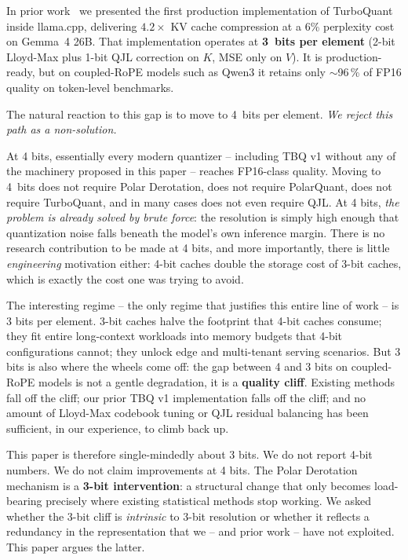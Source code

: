 \documentclass[10pt,twocolumn]{article}
\begin{document}
In prior work~\cite{turboquant_impl2026} we presented the first production implementation of TurboQuant~\cite{turboquant2026} inside llama.cpp, delivering $4.2\times$ KV cache compression at a 6\% perplexity cost on Gemma~4 26B. That implementation operates at \textbf{3~bits per element} (2-bit Lloyd-Max plus 1-bit QJL correction on $K$, MSE only on $V$). It is production-ready, but on coupled-RoPE models such as Qwen3 it retains only $\sim$96\,\% of FP16 quality on token-level benchmarks.

The natural reaction to this gap is to move to 4~bits per element. \emph{We reject this path as a non-solution.}

At 4 bits, essentially every modern quantizer -- including TBQ v1 without any of the machinery proposed in this paper -- reaches FP16-class quality. Moving to 4~bits does not require Polar Derotation, does not require PolarQuant, does not require TurboQuant, and in many cases does not even require QJL. At 4 bits, \emph{the problem is already solved by brute force}: the resolution is simply high enough that quantization noise falls beneath the model's own inference margin. There is no research contribution to be made at 4 bits, and more importantly, there is little \emph{engineering} motivation either: 4-bit caches double the storage cost of 3-bit caches, which is exactly the cost one was trying to avoid.

The interesting regime -- the only regime that justifies this entire line of work -- is 3 bits per element. 3-bit caches halve the footprint that 4-bit caches consume; they fit entire long-context workloads into memory budgets that 4-bit configurations cannot; they unlock edge and multi-tenant serving scenarios. But 3 bits is also where the wheels come off: the gap between 4 and 3 bits on coupled-RoPE models is not a gentle degradation, it is a \textbf{quality cliff}. Existing methods fall off the cliff; our prior TBQ v1 implementation falls off the cliff; and no amount of Lloyd-Max codebook tuning or QJL residual balancing has been sufficient, in our experience, to climb back up.

This paper is therefore single-mindedly about 3 bits. We do not report 4-bit numbers. We do not claim improvements at 4 bits. The Polar Derotation mechanism is a \textbf{3-bit intervention}: a structural change that only becomes load-bearing precisely where existing statistical methods stop working. We asked whether the 3-bit cliff is \emph{intrinsic} to 3-bit resolution or whether it reflects a redundancy in the representation that we -- and prior work -- have not exploited. This paper argues the latter.
\end{document}
